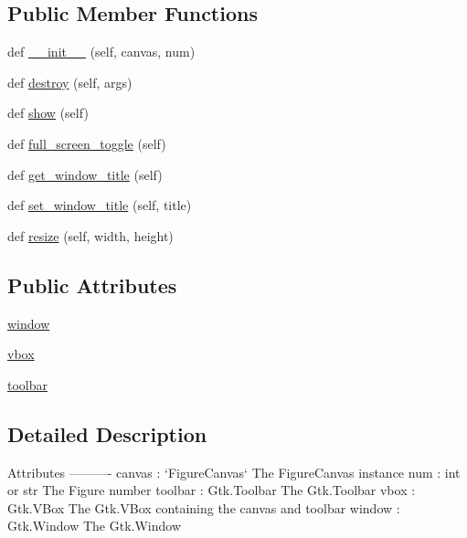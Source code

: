 \subsection*{Public Member Functions}
\begin{DoxyCompactItemize}
\item 
def \hyperlink{classmatplotlib_1_1backends_1_1backend__gtk3_1_1FigureManagerGTK3_ab2d7514f75bfd7606f764cd95110dde9}{\+\_\+\+\_\+init\+\_\+\+\_\+} (self, canvas, num)
\item 
def \hyperlink{classmatplotlib_1_1backends_1_1backend__gtk3_1_1FigureManagerGTK3_a7962c90b66f7301ae49ef1814d3a778d}{destroy} (self, args)
\item 
def \hyperlink{classmatplotlib_1_1backends_1_1backend__gtk3_1_1FigureManagerGTK3_af09ed4fe20717094522435208ddde2c0}{show} (self)
\item 
def \hyperlink{classmatplotlib_1_1backends_1_1backend__gtk3_1_1FigureManagerGTK3_aeef8cf3ee43c13f88cf70e7570cb77c0}{full\+\_\+screen\+\_\+toggle} (self)
\item 
def \hyperlink{classmatplotlib_1_1backends_1_1backend__gtk3_1_1FigureManagerGTK3_ab8b0d9f6cf221c39ee8c80acd033cb43}{get\+\_\+window\+\_\+title} (self)
\item 
def \hyperlink{classmatplotlib_1_1backends_1_1backend__gtk3_1_1FigureManagerGTK3_aec0708d4ae53ee64ed10eb01f30182bc}{set\+\_\+window\+\_\+title} (self, title)
\item 
def \hyperlink{classmatplotlib_1_1backends_1_1backend__gtk3_1_1FigureManagerGTK3_a2ff4fe0d4018e75f237b3f17f579c4ee}{resize} (self, width, height)
\end{DoxyCompactItemize}
\subsection*{Public Attributes}
\begin{DoxyCompactItemize}
\item 
\hyperlink{classmatplotlib_1_1backends_1_1backend__gtk3_1_1FigureManagerGTK3_ac85dd7db224b625b9539c15b92ce61eb}{window}
\item 
\hyperlink{classmatplotlib_1_1backends_1_1backend__gtk3_1_1FigureManagerGTK3_a701fcc2b22d57fb54fb44a98dd1e04a1}{vbox}
\item 
\hyperlink{classmatplotlib_1_1backends_1_1backend__gtk3_1_1FigureManagerGTK3_a890be6933176f952cf3715eef33f445e}{toolbar}
\end{DoxyCompactItemize}


\subsection{Detailed Description}
\begin{DoxyVerb}Attributes
----------
canvas : `FigureCanvas`
    The FigureCanvas instance
num : int or str
    The Figure number
toolbar : Gtk.Toolbar
    The Gtk.Toolbar
vbox : Gtk.VBox
    The Gtk.VBox containing the canvas and toolbar
window : Gtk.Window
    The Gtk.Window\end{DoxyVerb}
 

